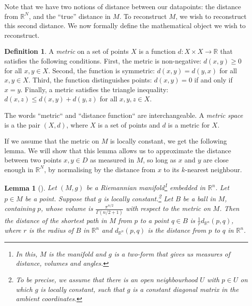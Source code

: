 \documentclass[a4paper,12pt,leqno]{article} \usepackage{amsmath}
\newcommand{\RR}{\mathbb{R}} \newcommand{\QQ}{\mathbb{Q}}
\newtheorem*{lemma}{Lemma}
\theoremstyle{definition}
\newtheorem{defn}{Definition}
\begin{document}
Note that we have two notions of distance between our datapoints: the distance
from $\RR^N$, and the ``true'' distance in $M$.
To reconstruct $M$, we wish to reconstruct this second distance.
We now formally define the mathematical object we wish to reconstruct.

\begin{defn}
  A \emph{metric} on a set of points $X$ is a function $d: X\times X\to \RR$
  that satisfies the following conditions.
  First, the metric is non-negative: $d(x, y) \geq 0$ for all $x, y\in X$.
  Second, the function is symmetric: $d(x, y) = d(y, x)$ for all $x, y\in X$.
  Third, the function distinguishes points: $d(x, y) = 0$ if and only if $x
  = y$.
  Finally, a metric satisfies the triangle inequality: $d(x, z)\leq d(x, y)
  + d(y, z)$ for all $x,y,z\in X$.
\end{defn}

The words ``metric`` and ``distance function`` are interchangeable.
A \emph{metric space} is a the pair $(X, d)$, where $X$ is a set of points and
$d$ is a metric for $X$.

If we assume that the metric on $M$ is locally constant, we get the following
lemma.
We will show that this lemma allows us to approximate the distance between two
points $x, y\in D$ as measured in $M$, so long as $x$ and $y$ are close enough
in $\RR^N$, by normalising by the distance from $x$ to its $k$-nearest
neighbour.

\begin{lemma}[\cite{McInnes18}]
  Let $(M, g)$ be a Riemannian manifold\footnote{
    In this, $M$ is the manifold and $g$ is a two-form that gives us measures of
    distance, volumes and angles.
  } embedded in $\RR^n$.
  Let $p\in M$ be a point.
  Suppose that $g$ is locally constant.\footnote{
    To be precise, we assume that there is an open neighbourhood $U$ with
    $p\in U$ on which $g$ is locally constant, such that $g$ is a constant
    diagonal matrix in the ambient coordinates.
  }
  Let $B$ be a ball in $M$, containing $p$, whose volume is
  $\frac{\pi^{n/2}}{\Gamma(n/2+1)}$ with respect to the metric on $M$.
  Then the distance of the shortest path in $M$ from $p$ to a point $q\in B$ is
  $\frac{1}{r}d_{\RR^n}(p, q)$, where $r$ is the radius of $B$ in $\RR^n$ and
  $d_{\RR^n}(p, q)$ is the distance from $p$ to $q$ in $\RR^n$.
\end{lemma}
\end{document}
